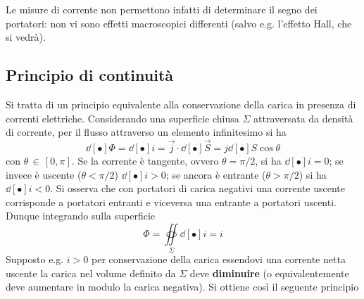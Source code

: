 Le misure di corrente non permettono infatti di determinare il segno dei portatori: non vi sono effetti macroscopici differenti (salvo e.g. l'effetto Hall, che si vedrà).


\subsection{Principio di continuità}
Si tratta di un principio equivalente alla conservazione della carica in presenza di correnti elettriche. Considerando una superficie chiusa $\Sigma$ attraversata da densità di corrente, per il flusso attraverso un elemento infinitesimo si ha
\[\dd[•]{\Phi} = \dd[•]{i} = \vec{j} \cdot \dd[•]{\vec{S}} = j \dd[•]{S} \cos \theta\]
con $\theta \, \in \, [0, \pi]$. Se la corrente è tangente, ovvero $\theta = \pi/2$, si ha $\dd[•]{i} = 0$; se invece è uscente ($\theta < \pi/2$) $\dd[•]{i} > 0$; se ancora è entrante ($\theta > \pi/2$) si ha $\dd[•]{i} < 0$. Si osserva che con portatori di carica negativi una corrente uscente corrisponde a portatori entranti e viceversa una entrante a portatori uscenti.
\\Dunque integrando sulla superficie
\[\Phi = \oiint\limits_\Sigma \dd[•]{i} = i\]
Supposto e.g. $i > 0$ per conservazione della carica essendovi una corrente netta uscente la carica nel volume definito da $\Sigma$ deve \textbf{diminuire} (o equivalentemente deve aumentare in modulo la carica negativa). Si ottiene così il seguente principio


